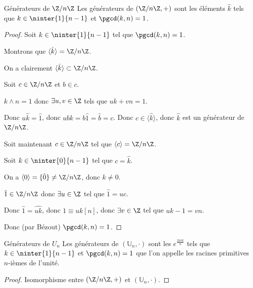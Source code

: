 \begin{theoreme}{Générateurs de $\Z / n \Z$}{}
    Les générateurs de $(\Z/n\Z, +)$ sont les éléments $\hat k$ tels que 
    $k \in \ninter{1}{n-1}$ et $\pgcd(k, n) = 1$.
\end{theoreme}


\begin{proof}
    Soit $k \in \ninter{1}{n-1}$ tel que $\pgcd(k, n) = 1$.

    Montrons que $\langle \hat k \rangle = \Z / n \Z$.

    On a clairement $\langle \hat k \rangle \subset \Z / n \Z$.

    Soit $c \in \Z / n \Z$ et $b \in c$.

    $k \wedge n = 1$ donc $\exists u, v \in \Z$ tels que $uk + vn = 1$.

    Donc $u\hat k = \hat 1$, donc $ub \hat k = b \hat 1 = \hat b = c$. Donc $c \in \langle \hat k \rangle$, 
    donc $\hat k$ est un générateur de $\Z / n \Z$.

    \avspace Soit maintenant $c \in \Z / n \Z$ tel que $\langle c \rangle = \Z / n \Z$.

    Soit $k \in \ninter {0}{n-1}$ tel que $c = \hat k$.

    On a $\langle 0 \rangle = \{\hat 0\} \neq \Z / n \Z$, donc $k \neq 0$.

    $\hat 1 \in \Z / n \Z$ donc $\exists u \in \Z$ tel que $\hat 1 = u c$. 

    Donc $\hat 1 = \widehat{uk}$, donc $1 \equiv uk [n]$, donc $\exists v \in \Z$ tel que $uk - 1 = vn$.

    Donc (par Bézout) $\pgcd(k, n) = 1$.

\end{proof}

\begin{corollaire}{Générateurs de $U_n$}{}
    Les générateurs de $(\mathbb U_n, \cdot)$ sont les $e^{\frac{2i\pi k} n}$ tels que 
    $k \in \ninter{1}{n-1}$ et $\pgcd(k, n) = 1$ que l'on appelle les racines primitives $n$-ièmes de l'unité.
\end{corollaire}

\begin{proof}
    Isomorphisme entre $(\Z / n \Z, +)$ et $(\mathbb U_n, \cdot)$.
\end{proof}

